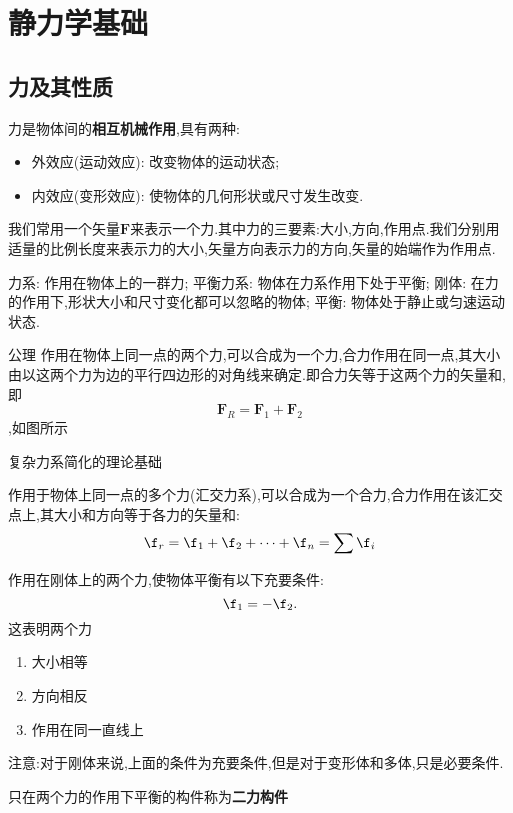 \section{静力学基础}
\subsection{力及其性质}
\begin{definition}[力的定义]
    力是物体间的\textbf{相互机械作用},具有两种:
    \begin{itemize}
        \item 外效应(运动效应): 改变物体的运动状态;
        \item 内效应(变形效应): 使物体的几何形状或尺寸发生改变.
    \end{itemize}
\end{definition}
\begin{definition}[力的三要素]
    我们常用一个矢量$\bm F$来表示一个力.其中力的三要素:大小,方向,作用点.我们分别用适量的比例长度来表示力的大小,矢量方向表示力的方向,矢量的始端作为作用点.
\end{definition}
\begin{definition}[力系的概念]
    力系: 作用在物体上的一群力;
    平衡力系: 物体在力系作用下处于平衡;
    刚体: 在力的作用下,形状大小和尺寸变化都可以忽略的物体;
    平衡: 物体处于静止或匀速运动状态.
\end{definition}

\begin{theorem}公理
    作用在物体上同一点的两个力,可以合成为一个力,合力作用在同一点,其大小由以这两个力为边的平行四边形的对角线来确定.即合力矢等于这两个力的矢量和,即\[\bm{F}_R=\bm{F}_1+\bm{F}_2\],如图所示


    复杂力系简化的理论基础
\end{theorem}
\begin{inference}[力的多边形法则]
    作用于物体上同一点的多个力(汇交力系),可以合成为一个合力,合力作用在该汇交点上,其大小和方向等于各力的矢量和:
    \[\f_r=\f_1+\f_2+\cdots+\f_n=\sum \f_i\]

\end{inference}

\begin{theorem}[二力平衡条件]
    作用在刚体上的两个力,使物体平衡有以下充要条件:\[\f_1=-\f_2.\]这表明两个力
    \begin{enumerate}
        \item 大小相等
        \item 方向相反
        \item 作用在同一直线上
    \end{enumerate}
    注意:对于刚体来说,上面的条件为充要条件,但是对于变形体和多体,只是必要条件.
\end{theorem}
\begin{definition}
    只在两个力的作用下平衡的构件称为\textbf{二力构件}
\end{definition}

